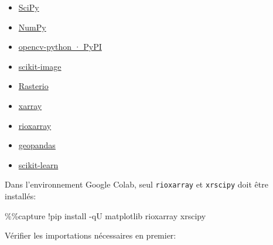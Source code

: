 \documentclass[
]{article}
\newenvironment{Shaded}{}{}
\newcommand{\NormalTok}[1]{#1}
\newcommand{\OperatorTok}[1]{\textcolor[rgb]{0.40,0.40,0.40}{#1}}
\begin{document}
\begin{itemize}
\item
  \href{https://scipy.org/}{SciPy}
\item
  \href{https://numpy.org/}{NumPy}
\item
  \href{https://pypi.org/project/opencv-python/}{opencv-python · PyPI}
\item
  \href{https://scikit-image.org/}{scikit-image}
\item
  \href{https://rasterio.readthedocs.io/en/stable/}{Rasterio}
\item
  \href{https://docs.xarray.dev/en/stable/}{xarray}
\item
  \href{https://corteva.github.io/rioxarray/stable/index.html}{rioxarray}
\item
  \href{https://geopandas.org}{geopandas}
\item
  \href{https://scikit-learn.org/}{scikit-learn}
\end{itemize}

Dans l'environnement Google Colab, seul \texttt{rioxarray} et
\texttt{xrscipy} doit être installés:

\label{22c36f13}
\label{cb1}
\begin{Shaded}
\begin{Highlighting}[]
\OperatorTok{\%\%}\NormalTok{capture}
\OperatorTok{!}\NormalTok{pip install }\OperatorTok{{-}}\NormalTok{qU matplotlib rioxarray xrscipy}
\end{Highlighting}
\end{Shaded}

Vérifier les importations nécessaires en premier:
\end{document}

